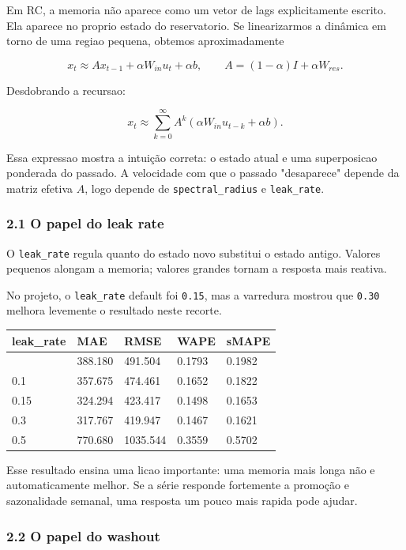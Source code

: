 \documentclass[12pt]{article}
\begin{document}
Em RC, a memoria não aparece como um vetor de lags explicitamente escrito. Ela aparece no proprio estado do reservatorio. Se linearizarmos a dinâmica em torno de uma regiao pequena, obtemos aproximadamente

\[
x_t \approx A x_{t-1} + \alpha W_{in} u_t + \alpha b,
\qquad
A = (1 - \alpha) I + \alpha W_{res}.
\]

Desdobrando a recursao:

\[
x_t \approx \sum_{k=0}^\infty A^k (\alpha W_{in} u_{t-k} + \alpha b).
\]

Essa expressao mostra a intuição correta: o estado atual e uma superposicao ponderada do passado. A velocidade com que o passado "desaparece" depende da matriz efetiva \(A\), logo depende de \texttt{spectral\_radius} e \texttt{leak\_rate}.

\subsubsection{2.1 O papel do leak rate}\label{21-o-papel-do-leak-rate}

O \texttt{leak\_rate} regula quanto do estado novo substitui o estado antigo. Valores pequenos alongam a memoria; valores grandes tornam a resposta mais reativa.

No projeto, o \texttt{leak\_rate} default foi \texttt{0.15}, mas a varredura mostrou que \texttt{0.30} melhora levemente o resultado neste recorte.

\begin{longtable}[]{@{}lllll@{}}
\toprule\noalign{}
leak\_rate & MAE & RMSE & WAPE & sMAPE \\
\midrule\noalign{}
\endhead
\bottomrule\noalign{}
\endlastfoot
0.05 & 388.180 & 491.504 & 0.1793 & 0.1982 \\
0.1 & 357.675 & 474.461 & 0.1652 & 0.1822 \\
0.15 & 324.294 & 423.417 & 0.1498 & 0.1653 \\
0.3 & 317.767 & 419.947 & 0.1467 & 0.1621 \\
0.5 & 770.680 & 1035.544 & 0.3559 & 0.5702 \\
\end{longtable}

Esse resultado ensina uma licao importante: uma memoria mais longa não e automaticamente melhor. Se a série responde fortemente a promoção e sazonalidade semanal, uma resposta um pouco mais rapida pode ajudar.

\subsubsection{2.2 O papel do washout}\label{22-o-papel-do-washout}
\end{document}
